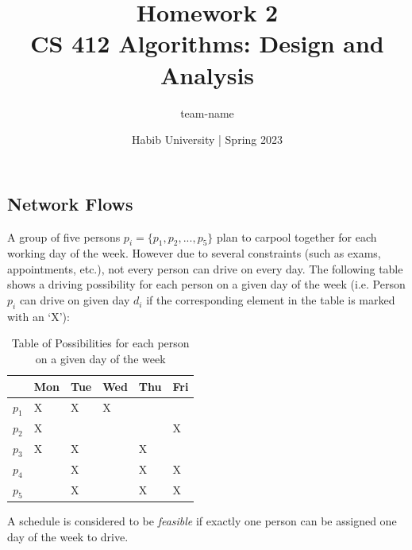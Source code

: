 \documentclass[addpoints,a4paper]{exam}
\title{Homework 2\\ CS 412 Algorithms: Design and Analysis}
\author{team-name}  %
\date{Habib University | Spring 2023}
\begin{document}
\maketitle

\begin{questions}


  \section*{Network Flows}
  \question A group of five persons $p_i = \{p_1, p_2, ..., p_5\}$ plan to carpool together for each working day of the week. However due to several constraints (such as exams, appointments, etc.), not every person can drive on every day. The following table shows a driving possibility for each person on a given day of the week (i.e. Person $p_i$ can drive on given day $d_i$ if the corresponding element in the table is marked with an `X'):

  \begin{table}[h]
    \centering
    \renewcommand{\arraystretch}{1.5}
    \begin{tabular}{llllll}
            & Mon & Tue & Wed & Thu & Fri \\ \hline
      $p_1$ & X   & X   & X   &     &     \\ \hline
      $p_2$ & X   &     &     &     & X   \\ \hline
      $p_3$ & X   & X   &     & X   &     \\ \hline
      $p_4$ &     & X   &     & X   & X   \\ \hline
      $p_5$ &     & X   &     & X   & X   \\ \hline
    \end{tabular}%
    \caption{Table of Possibilities for each person on a given day of the week} \label{key}
  \end{table}

  A schedule is considered to be \textit{feasible} if exactly one person can be assigned one day of the week to drive.
  \begin{solution}


\end{solution}
\end{questions}
\end{document}
